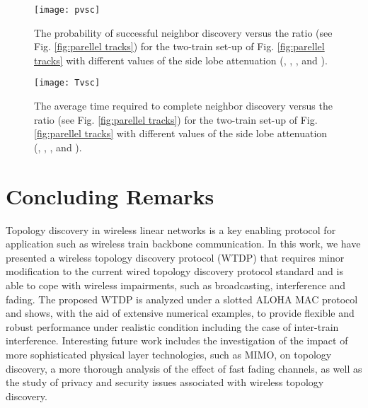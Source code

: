 \documentclass[10pt,english,two column]{IEEEtran}
\begin{document}
\begin{figure}[h]
\begin{centering}
\textsf{\texttt{[image: pvsc]}}
\par\end{centering}

\caption{\label{fig:PvsC}The probability of successful neighbor discovery
versus the ratio  (see Fig. \ref{fig:parellel tracks})
for the two-train set-up of Fig. \ref{fig:parellel tracks} with different
values of the side lobe attenuation  (, ,
,  and ).}
\end{figure}


\begin{figure}[h]
\begin{centering}
\textsf{\texttt{[image: Tvsc]}}
\par\end{centering}

\caption{\label{fig:TvsC}The average time required to complete neighbor discovery
versus the ratio  (see Fig. \ref{fig:parellel tracks})
for the two-train set-up of Fig. \ref{fig:parellel tracks} with different
values of the side lobe attenuation  (, ,
,  and ). }
\end{figure}



\section{Concluding Remarks}

Topology discovery in wireless linear networks is a key enabling protocol
for application such as wireless train backbone communication. In
this work, we have presented a wireless topology discovery protocol
(WTDP) that requires minor modification to the current wired topology
discovery protocol standard and is able to cope with wireless impairments,
such as broadcasting, interference and fading. The proposed WTDP is
analyzed under a slotted ALOHA MAC protocol and shows, with the aid
of extensive numerical examples, to provide flexible and robust performance
under realistic condition including the case of inter-train interference.
Interesting future work includes the investigation of the impact of
more sophisticated physical layer technologies, such as MIMO, on topology
discovery, a more thorough analysis of the effect of fast fading channels,
as well as the study of privacy and security issues associated with
wireless topology discovery.
\end{document}
